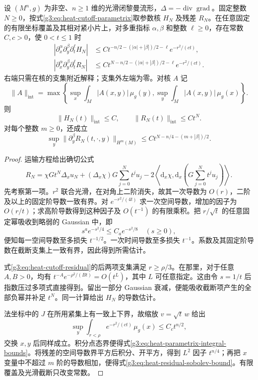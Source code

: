\begin{lemma}\label{g3:lem:heat-parametrix-error-bounds}
	设 \((M^n,g)\) 为非空、\(n\ge1\) 维的光滑闭黎曼流形，\(\Delta=-\operatorname{div}\operatorname{grad}\)。固定整数 \(N\ge0\)，按式\eqref{g3:eq:heat-cutoff-parametrix}取参数核 \(H_N\) 及残差 \(R_N\)。在任意固定的有限坐标覆盖及其相对紧小片上，对多重指标 \(\alpha,\beta\) 和整数 \(\ell\ge0\)，存在常数 \(C,c>0\)，使 \(0<t\le1\) 时
	\begin{align}
		|\partial_x^\alpha\partial_y^\beta\partial_t^\ell H_N|
		&\le Ct^{-n/2-(|\alpha|+|\beta|)/2-\ell}e^{-r^2/(ct)},\label{g3:eq:heat-parametrix-gaussian-bound}\\
		|\partial_x^\alpha\partial_y^\beta\partial_t^\ell R_N|
		&\le Ct^{N-n/2-(|\alpha|+|\beta|)/2-\ell}e^{-r^2/(ct)}.\label{g3:eq:heat-residual-gaussian-bound}
	\end{align}
	右端只需在核的支集附近解释；支集外左端为零。对核 \(A\) 记
	\[
		\|A\|_{\mathrm{int}}=
		\max\left\{\sup_x\int_M|A(x,y)|\,\mu_g(y),
		\sup_y\int_M|A(x,y)|\,\mu_g(x)\right\}.
	\]
	则
	\begin{equation}\label{g3:eq:heat-parametrix-integral-bounds}
		\|H_N(t)\|_{\mathrm{int}}\le C,
		\qquad \|R_N(t)\|_{\mathrm{int}}\le Ct^N.
	\end{equation}
	对每个整数 \(m\ge0\)，还成立
	\begin{equation}\label{g3:eq:heat-residual-sobolev-bound}
		\sup_y\|\partial_y^\beta R_N(t,\cdot,y)\|_{H^m(M)}
		\le Ct^{N-n/4-(m+|\beta|)/2}.
	\end{equation}
\end{lemma}
\begin{proof}
	运输方程给出确切公式
	\begin{equation}\label{g3:eq:heat-cutoff-residual}
		R_N=\chi Gt^N\Delta_xu_N
		+(\Delta_x\chi)G\sum_{j=0}^Nt^ju_j
		-2\left\langle\mathrm d_x\chi,
		\mathrm d_x\left(G\sum_{j=0}^Nt^ju_j\right)\right\rangle.
	\end{equation}
	先考察第一项。\(r^2\) 联合光滑，在对角上二阶消失，故其一次导数为 \(O(r)\)，二阶及以上的固定阶导数一致有界。对 \(e^{-r^2/(4t)}\) 求一次空间导数，增加的因子为 \(O(r/t)\)；求高阶导数得到这种因子及 \(O(t^{-1})\) 的有限乘积。把 \(r/\sqrt t\) 的任意固定幂吸收到略弱的 Gaussian 中，即
	\[
		s^a e^{-s^2/4}\le C_a e^{-s^2/8}\quad(s\ge0),
	\]
	便知每一空间导数至多损失 \(t^{-1/2}\)。一次时间导数至多损失 \(t^{-1}\)。系数及其固定阶导数在截断支集上一致有界，因此得到所需估计。

	式\eqref{g3:eq:heat-cutoff-residual}的后两项支集满足 \(r\ge\rho/3\)。在那里，对于任意 \(A,B>0\)，均有 \(t^{-A}e^{-\rho^2/(Bt)}=O(t^L)\)，其中 \(L\) 可任意指定。这由令 \(s=1/t\) 后指数压过多项式直接得到。留出一部分 Gaussian 衰减，便能吸收截断项产生的全部负幂并补足 \(t^N\)。同一计算给出 \(H_N\) 的导数估计。

	法坐标中的 \(J\) 在所用紧集上有一致上下界，故缩放 \(v=\sqrt t\,w\) 给出
	\[
		\sup_y\int_{r<\rho}e^{-r^2/(ct)}\,\mu_g(x)\le C_ct^{n/2},
	\]
	交换 \(x,y\) 后同样成立。积分点态界便得式\eqref{g3:eq:heat-parametrix-integral-bounds}。将残差的空间导数界平方后积分、开平方，得到 \(L^2\) 因子 \(t^{n/4}\)；再把 \(x\) 变量中不超过 \(m\) 阶的导数相加，便得式\eqref{g3:eq:heat-residual-sobolev-bound}。有限覆盖及光滑截断只改变常数。
\end{proof}

